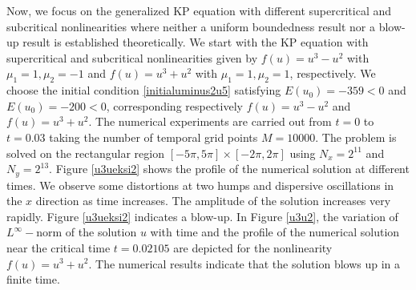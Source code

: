 \documentclass[10pt]{article}
\numberwithin{equation}{section}
\begin{document}
	
	Now, we focus on the generalized KP equation with different supercritical and subcritical nonlinearities where neither a uniform boundedness result nor a blow-up result is established theoretically. We start with the KP equation with supercritical and subcritical nonlinearities given by $f(u)=u^3-u^2$ with $\mu_1=1, \mu_2=-1$ and \mbox{$f(u)=u^3+u^2$} with $\mu_1=1, \mu_2=1$, respectively.   We choose the initial condition \eqref{initialuminus2u5}
	satisfying $E(u_0)=-359<0$ and  $E(u_0)=-200<0$, corresponding respectively \mbox{$f(u)=u^3-u^2$} and {$f(u)=u^3+u^2$}.
	The numerical experiments are carried out  from $t = 0$ to $t = 0.03$ taking  the number of temporal
	grid points $M = 10000$. The problem is solved on the rectangular region $[-5\pi, 5\pi]\times [-2\pi, 2\pi]$ using ${N_x}=2^{11}$ and ${N_y}=2^{13}$. Figure \ref{u3ueksi2} shows the profile of the numerical solution at different times.  We observe some distortions at two humps and dispersive oscillations in the $x$ direction as time increases. The amplitude of the solution increases very rapidly. Figure  \ref{u3ueksi2} indicates a blow-up.  In Figure \ref{u3u2}, the variation of  $L^{\infty}-$norm of the solution $u$  with time and 
	the profile of the numerical solution near the critical time $t=0.02105$ are depicted for the nonlinearity $f(u)=u^3+u^2$. The numerical results indicate that the solution blows up in a finite time. 
	
\end{document}
